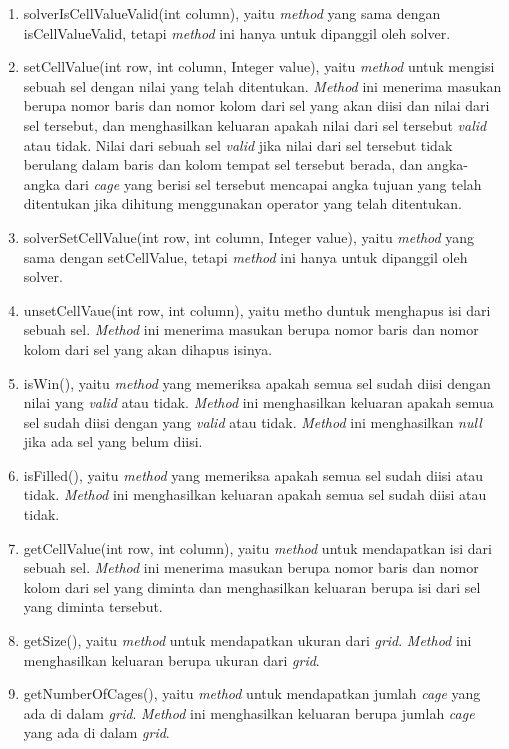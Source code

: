 \begin{enumerate}
\item solverIsCellValueValid(int column), yaitu \textit{method} yang sama dengan isCellValueValid, tetapi \textit{method} ini hanya untuk dipanggil oleh solver.
\item setCellValue(int row, int column, Integer value), yaitu \textit{method} untuk mengisi sebuah sel dengan nilai yang telah ditentukan. \textit{Method} ini menerima masukan berupa nomor baris dan nomor kolom dari sel yang akan diisi dan nilai dari sel tersebut, dan menghasilkan keluaran apakah nilai dari sel tersebut \textit{valid} atau tidak. Nilai dari sebuah sel \textit{valid} jika nilai dari sel tersebut tidak berulang dalam baris dan kolom tempat sel tersebut berada, dan angka-angka dari \textit{cage} yang berisi sel tersebut mencapai angka tujuan yang telah ditentukan jika dihitung menggunakan operator yang telah ditentukan.
\item solverSetCellValue(int row, int column, Integer value), yaitu \textit{method} yang sama dengan setCellValue, tetapi \textit{method} ini hanya untuk dipanggil oleh solver.
\item unsetCellVaue(int row, int column), yaitu metho duntuk menghapus isi dari sebuah sel. \textit{Method} ini menerima masukan berupa nomor baris dan nomor kolom dari sel yang akan dihapus isinya.
\item isWin(), yaitu \textit{method} yang memeriksa apakah semua sel sudah diisi dengan nilai yang \textit{valid} atau tidak. \textit{Method} ini menghasilkan keluaran apakah semua sel sudah diisi dengan yang \textit{valid} atau tidak. \textit{Method} ini menghasilkan \textit{null} jika ada sel yang belum diisi.
\item isFilled(), yaitu \textit{method} yang memeriksa apakah semua sel sudah diisi atau tidak. \textit{Method} ini menghasilkan keluaran apakah semua sel sudah diisi atau tidak.
\item getCellValue(int row, int column), yaitu \textit{method} untuk mendapatkan isi dari sebuah sel. \textit{Method} ini menerima masukan berupa nomor baris dan nomor kolom dari sel yang diminta dan menghasilkan keluaran berupa isi dari sel yang diminta tersebut.
\item getSize(), yaitu \textit{method} untuk mendapatkan ukuran dari \textit{grid}. \textit{Method} ini menghasilkan keluaran berupa ukuran dari \textit{grid}.
\item getNumberOfCages(), yaitu \textit{method} untuk mendapatkan jumlah \textit{cage} yang ada di dalam \textit{grid}. \textit{Method} ini menghasilkan keluaran berupa jumlah \textit{cage} yang ada di dalam \textit{grid}.

\end{enumerate}
